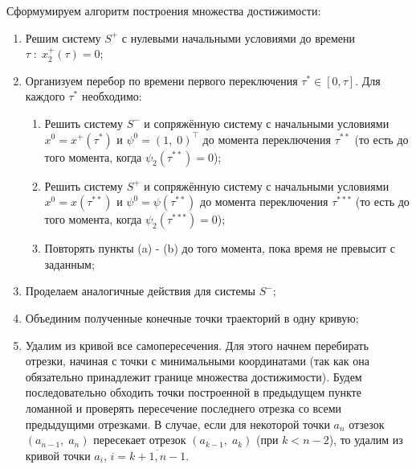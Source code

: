Сформумируем алгоритм построения множества достижимости:
\begin{enumerate}
        \item Решим систему $S^+$ с нулевыми начальными условиями до времени $\tau\;:\; x^+_2(\tau) = 0$;
        \item Организуем перебор по времени первого переключения $\tau^* \in [0, \tau]$. Для каждого $\tau^*$ необходимо:
        \begin{enumerate}
                \item Решить систему $S^-$ и сопряжённую систему с начальными условиями $x^0 = x^+(\tau^*)$ и $\psi^0 = (1,\; 0)^{\top}$ до момента переключения $\tau^{**}$ (то есть до того момента, когда $\psi_2(\tau^{**}) = 0$);
                \item Решить систему $S^+$ и сопряжённую систему с начальными условиями $x^0 = x(\tau^{**})$ и $\psi^0 = \psi(\tau^{**})$ до момента переключения $\tau^{***}$ (то есть до того момента, когда $\psi_2(\tau^{***}) = 0$);
                \item Повторять пункты (a) - (b) до того момента, пока время не превысит с заданным;
        \end{enumerate}
        \item Проделаем аналогичные действия для системы $S^-$;
        \item Объединим полученные конечные точки траекторий в одну кривую;
        \item Удалим из кривой все самопересечения. Для этого начнем перебирать отрезки, начиная с точки с минимальными координатами (так как она обязательно принадлежит границе множества достижимости). Будем последовательно обходить точки построенной в предыдущем пункте ломанной и проверять пересечение последнего отрезка со всеми предыдущими отрезками. В случае, если для некоторой точки $a_n$ отзезок $(a_{n-1},\; a_{n})$ пересекает отрезок $(a_{k-1},\; a_{k})$ (при $k<n-2$), то удалим из кривой точки $a_i$, $i = \overline{k+1, n-1}$.
\end{enumerate}